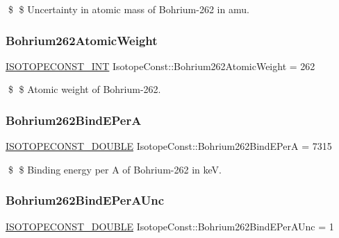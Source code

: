 \$ \$ Uncertainty in atomic mass of Bohrium-\/262 in amu. \mbox{\label{group___isotope_const-_bohrium-_bh262_ga6071f8f3d950c9bb2850f7fdcfd856c1}} 
\subsubsection{\texorpdfstring{Bohrium262\+Atomic\+Weight}{Bohrium262AtomicWeight}}
{\footnotesize\ttfamily \mbox{\hyperlink{group___isotope_const-_macros_ga5f18360b3e99483a35c32d789e62621c}{I\+S\+O\+T\+O\+P\+E\+C\+O\+N\+S\+T\+\_\+\+I\+NT}} Isotope\+Const\+::\+Bohrium262\+Atomic\+Weight = 262}

\$ \$ Atomic weight of Bohrium-\/262. \mbox{\label{group___isotope_const-_bohrium-_bh262_ga068ca92b9e6ef8815eaefd7495d6f7a5}} 
\subsubsection{\texorpdfstring{Bohrium262\+Bind\+E\+PerA}{Bohrium262BindEPerA}}
{\footnotesize\ttfamily \mbox{\hyperlink{group___isotope_const-_macros_ga8f45a7272ce02c0b4c65c44636ed719a}{I\+S\+O\+T\+O\+P\+E\+C\+O\+N\+S\+T\+\_\+\+D\+O\+U\+B\+LE}} Isotope\+Const\+::\+Bohrium262\+Bind\+E\+PerA = 7315}

\$ \$ Binding energy per A of Bohrium-\/262 in keV. \mbox{\label{group___isotope_const-_bohrium-_bh262_gae039e2733af4f575ff5329f2a0da6e95}} 
\subsubsection{\texorpdfstring{Bohrium262\+Bind\+E\+Per\+A\+Unc}{Bohrium262BindEPerAUnc}}
{\footnotesize\ttfamily \mbox{\hyperlink{group___isotope_const-_macros_ga8f45a7272ce02c0b4c65c44636ed719a}{I\+S\+O\+T\+O\+P\+E\+C\+O\+N\+S\+T\+\_\+\+D\+O\+U\+B\+LE}} Isotope\+Const\+::\+Bohrium262\+Bind\+E\+Per\+A\+Unc = 1}

